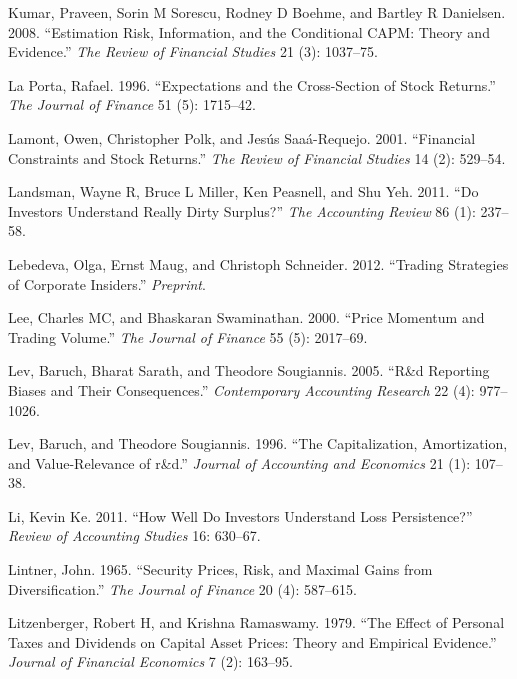 \documentclass[
  letterpaper,
  DIV=11,
  numbers=noendperiod]{scrreprt}
\newlength{\cslhangindent}
\newlength{\cslentryspacingunit} %
\newenvironment{CSLReferences}[2] %
 {%
  \setlength{\parindent}{0pt}
  \ifodd #1
  \let\oldpar\par
  \def\par{\hangindent=\cslhangindent\oldpar}
  \fi
  \setlength{\parskip}{#2\cslentryspacingunit}
 }%
 {}
\begin{document}
\begin{CSLReferences}{1}{0}
\leavevmode{}%
Kumar, Praveen, Sorin M Sorescu, Rodney D Boehme, and Bartley R
Danielsen. 2008. {``Estimation Risk, Information, and the Conditional
CAPM: Theory and Evidence.''} \emph{The Review of Financial Studies} 21
(3): 1037--75.

\leavevmode{}%
La Porta, Rafael. 1996. {``Expectations and the Cross-Section of Stock
Returns.''} \emph{The Journal of Finance} 51 (5): 1715--42.

\leavevmode{}%
Lamont, Owen, Christopher Polk, and Jesús Saaá-Requejo. 2001.
{``Financial Constraints and Stock Returns.''} \emph{The Review of
Financial Studies} 14 (2): 529--54.

\leavevmode{}%
Landsman, Wayne R, Bruce L Miller, Ken Peasnell, and Shu Yeh. 2011.
{``Do Investors Understand Really Dirty Surplus?''} \emph{The Accounting
Review} 86 (1): 237--58.

\leavevmode{}%
Lebedeva, Olga, Ernst Maug, and Christoph Schneider. 2012. {``Trading
Strategies of Corporate Insiders.''} \emph{Preprint}.

\leavevmode{}%
Lee, Charles MC, and Bhaskaran Swaminathan. 2000. {``Price Momentum and
Trading Volume.''} \emph{The Journal of Finance} 55 (5): 2017--69.

\leavevmode{}%
Lev, Baruch, Bharat Sarath, and Theodore Sougiannis. 2005. {``R\&d
Reporting Biases and Their Consequences.''} \emph{Contemporary
Accounting Research} 22 (4): 977--1026.

\leavevmode{}%
Lev, Baruch, and Theodore Sougiannis. 1996. {``The Capitalization,
Amortization, and Value-Relevance of r\&d.''} \emph{Journal of
Accounting and Economics} 21 (1): 107--38.

\leavevmode{}%
Li, Kevin Ke. 2011. {``How Well Do Investors Understand Loss
Persistence?''} \emph{Review of Accounting Studies} 16: 630--67.

\leavevmode{}%
Lintner, John. 1965. {``Security Prices, Risk, and Maximal Gains from
Diversification.''} \emph{The Journal of Finance} 20 (4): 587--615.

\leavevmode{}%
Litzenberger, Robert H, and Krishna Ramaswamy. 1979. {``The Effect of
Personal Taxes and Dividends on Capital Asset Prices: Theory and
Empirical Evidence.''} \emph{Journal of Financial Economics} 7 (2):
163--95.


\end{CSLReferences}
\end{document}
